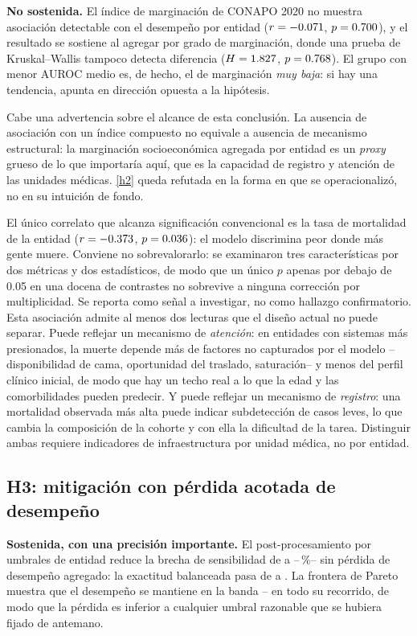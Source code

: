 \textbf{No sostenida.} El índice de marginación de CONAPO 2020 no muestra
asociación detectable con el desempeño por entidad ($r=-0.071$,
$p=0.700$), y el resultado se sostiene al agregar por grado de
marginación, donde una prueba de Kruskal--Wallis tampoco detecta diferencia
($H=1.827$, $p=0.768$). El grupo con menor AUROC medio es, de hecho, el
de marginación \emph{muy baja}: si hay una tendencia, apunta en dirección
opuesta a la hipótesis.

Cabe una advertencia sobre el alcance de esta conclusión. La ausencia de
asociación con un índice compuesto no equivale a ausencia de mecanismo
estructural: la marginación socioeconómica agregada por entidad es un
\emph{proxy} grueso de lo que importaría aquí, que es la capacidad de registro y
atención de las unidades médicas. \ref{h2} queda refutada en la forma en que se
operacionalizó, no en su intuición de fondo.

El único correlato que alcanza significación convencional es la tasa de mortalidad
de la entidad ($r=-0.373$, $p=0.036$): el modelo discrimina
peor donde más gente muere. Conviene no sobrevalorarlo: se examinaron tres
características por dos métricas y dos estadísticos, de modo que un único
$p$ apenas por debajo de 0.05 en una docena de contrastes no sobrevive a ninguna
corrección por multiplicidad. Se reporta como señal a investigar, no como
hallazgo confirmatorio. Esta asociación admite al menos dos lecturas que el diseño actual no puede
separar. Puede reflejar un mecanismo de \emph{atención}: en entidades con sistemas
más presionados, la muerte depende más de factores no capturados por el modelo
--disponibilidad de cama, oportunidad del traslado, saturación-- y menos del perfil
clínico inicial, de modo que hay un techo real a lo que la edad y las
comorbilidades pueden predecir. Y puede reflejar un mecanismo de \emph{registro}:
una mortalidad observada más alta puede indicar subdetección de casos leves, lo que
cambia la composición de la cohorte y con ella la dificultad de la tarea.
Distinguir ambas requiere indicadores de infraestructura por unidad médica, no por
entidad.

\subsection*{H3: mitigación con pérdida acotada de desempeño}

\textbf{Sostenida, con una precisión importante.} El post-procesamiento por
umbrales de entidad reduce la brecha de sensibilidad de \gapBase{} a \gapPost{}
--\reduccionPost\,\%-- sin pérdida de desempeño agregado: la exactitud balanceada
pasa de \accBase{} a \accPost. La frontera de Pareto muestra que el desempeño se
mantiene en la banda \paretoAccMin--\paretoAccMax{} en todo su recorrido, de modo que la pérdida es
inferior a cualquier umbral razonable que se hubiera fijado de antemano.

